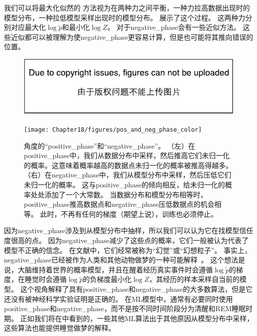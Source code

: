 我们可以将最大化似然的\,\,方法视为在两种力之间平衡，一种力拉高数据出现时的模型分布，一种拉低模型采样出现时的模型分布。%
展示了这个过程。
这两种力分别对应最大化$\log \tilde{p}$和最小化$\log Z$。
对于\gls{negative_phase}会有一些近似方法。
这些近似都可以被理解为使\gls{negative_phase}更容易计算，但是也可能将其推向错误的位置。%

\begin{figure}[!htb]
\ifOpenSource
\centerline{\includegraphics{figure.pdf}}
\else
\centerline{\texttt{[image: Chapter18/figures/pos\_and\_neg\_phase\_color]}}
\fi
\caption{角度的``\gls{positive_phase}''和``\gls{negative_phase}''。
（左）在\gls{positive_phase}中，我们从数据分布中采样，然后推高它们未归一化的概率。这意味着概率越高的数据点未归一化的概率被推高得越多。
（右）在\gls{negative_phase}中，我们从模型分布中采样，然后压低它们未归一化的概率。
这与\gls{positive_phase}的倾向相反，给未归一化的概率处处添加了一个大常数。
当数据分布和模型分布相等时，\gls{positive_phase}推高数据点和\gls{negative_phase}压低数据点的机会相等。
此时，不再有任何的梯度（期望上说），训练也必须停止。}
\label{fig:chap18_pos_and_neg_phase}
\end{figure}


因为\gls{negative_phase}涉及到从模型分布中抽样，所以我们可以认为它在找模型信任度很高的点。
因为\gls{negative_phase}减少了这些点的概率，它们一般被认为代表了模型不正确的信念。
在文献中，它们经常被称为``幻觉''或``幻想粒子''。
事实上，\gls{negative_phase}已经被作为人类和其他动物做梦的一种可能解释~\citep{CrickMitchison83}。
这个想法是说，大脑维持着世界的概率模型，并且在醒着经历真实事件时会遵循$\log \tilde{p}$的梯度，在睡觉时会遵循$\log \tilde{p}$的负梯度最小化$\log Z$，其经历的样本采样自当前的模型。
这个视角解释了具有\gls{positive_phase}和\gls{negative_phase}的大多数算法，但是它还没有被神经科学实验证明是正确的。
在\gls{ML}模型中，通常有必要同时使用\gls{positive_phase}和\gls{negative_phase}，而不是按不同时间阶段分为清醒和REM睡眠时期。
正如我们将在中看到的，一些其他\gls{ML}算法出于其他原因从模型分布中采样，这些算法也能提供睡觉做梦的解释。

